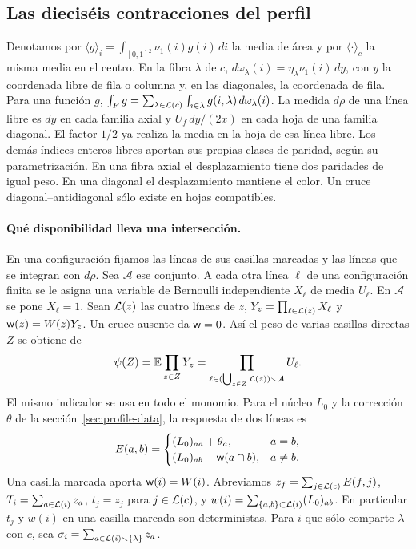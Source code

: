 \subsection{Las dieciséis contracciones del perfil}\label{sec:contracciones}
Denotamos por \(\langle g\rangle_i=\int_{[0,1]^2}\nu_1(i)g(i)\,di\) la media de área y
por \(\langle\cdot\rangle_c\) la misma media en el centro. En la fibra \(\lambda\)
de \(c\), \(d\omega_\lambda(i)=\eta_\lambda\nu_1(i)\,dy\), con \(y\) la coordenada libre
de fila o columna y, en las diagonales, la coordenada de fila. Para una función \(g\),
\(\int_F g=\sum_{\lambda\in \mathcal L(c)}\int_{i\in\lambda}g(i,\lambda)\,d\omega_\lambda(i)\).
La medida \(d\rho\) de una línea libre es \(dy\) en
cada familia axial y \(U_f\,dy/(2x)\) en cada hoja de una familia diagonal.
El factor \(1/2\) ya realiza la media en la hoja de esa línea libre. Los demás índices
enteros libres aportan sus propias clases de paridad, según su parametrización. En una fibra
axial el desplazamiento tiene dos paridades de igual peso. En una diagonal el desplazamiento
mantiene el color. Un cruce diagonal--antidiagonal sólo existe en hojas compatibles.

\paragraph{Qué disponibilidad lleva una intersección.}
En una configuración fijamos las líneas de sus casillas marcadas y las líneas que se integran
con \(d\rho\). Sea \(\mathcal A\) ese conjunto. A cada otra línea \(\ell\) de una configuración
finita se le asigna una variable de Bernoulli independiente \(X_\ell\) de media \(U_\ell\).
En \(\mathcal A\) se pone \(X_\ell=1\). Sean \(\mathcal L(z)\) las cuatro líneas de \(z\),
\(Y_z=\prod_{\ell\in \mathcal L(z)}X_\ell\) y \(\mathsf w(z)=W(z)Y_z\). Un cruce ausente da
 \(\mathsf w=0\).
Así el peso de varias casillas directas \(Z\) se obtiene de
\[
 \psi(Z)=\mathbb E\prod_{z\in Z}Y_z
 =\prod_{\ell\in(\bigcup_{z\in Z}\mathcal L(z))\smallsetminus\mathcal A}U_\ell .
\]
El mismo indicador se usa en todo el monomio. Para el núcleo \(L_0\) y la corrección
\(\theta\) de la sección~\ref{sec:profile-data}, la respuesta de dos líneas es
\[
 E(a,b)=
 \begin{cases}
 (L_0)_{aa}+\theta_a,&a=b,\\
 (L_0)_{ab}-\mathsf w(a\cap b),&a\ne b .
 \end{cases}
\]
Una casilla marcada aporta \(\mathsf w(i)=W(i)\). Abreviamos
\(z_f=\sum_{j\in \mathcal L(c)}E(f,j)\), \(T_i=\sum_{a\in \mathcal L(i)}z_a\),
\(t_j=z_j\) para \(j\in \mathcal L(c)\), y \(w(i)=\sum_{\{a,b\}\subset \mathcal L(i)}(L_0)_{ab}\).
En particular \(t_j\) y \(w(i)\) en una casilla marcada son deterministas.
Para \(i\) que sólo comparte \(\lambda\) con \(c\), sea
\(\sigma_i=\sum_{a\in \mathcal L(i)\smallsetminus\{\lambda\}}z_a\).

